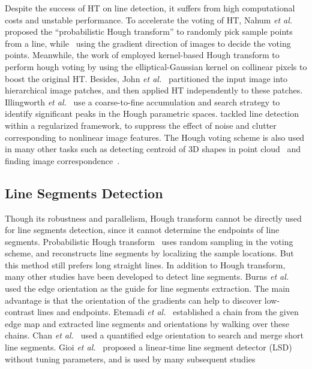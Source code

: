 \documentclass[10pt,journal,cspaper,compsoc]{IEEEtran}
\def\etal{\emph{et al.~}}
\begin{document}
Despite the success of HT on line detection, it suffers from high computational costs and unstable performance.
To accelerate the voting of HT, Nahum \etal \cite{kiryati1991probabilistic} 
proposed the ``probabilistic Hough transform'' to randomly pick 
sample points from a line, 
while~\cite{finding1976} using the gradient direction of images to decide 
the voting points.
Meanwhile, the work of \cite{fernandes2008real,limberger2015real} 
employed kernel-based Hough transform to perform hough voting by using 
the elliptical-Gaussian kernel on collinear pixels to boost the original HT.
Besides, John \etal \cite{princen1990hierarchical,yacoub1995hierarchical} partitioned the input image into
hierarchical image patches, and then applied HT independently to these patches.
Illingworth \etal \cite{illingworth1987adaptive} use a coarse-to-fine accumulation and search
strategy to identify significant peaks in the Hough parametric spaces.
\cite{aggarwal2006line} tackled line detection within a
regularized framework, to suppress the effect of noise and clutter corresponding to nonlinear image features.
The Hough voting scheme is also used in many other tasks such as
detecting centroid of 3D shapes in point cloud~\cite{qi2019deep} and finding image correspondence~\cite{min2019hyperpixel}.





\subsection{Line Segments Detection}
Though its robustness and parallelism, Hough transform cannot be directly used for line segments detection,
since it cannot determine the endpoints of line segments.
Probabilistic Hough transform~\cite{kiryati1991probabilistic} uses random sampling in the voting scheme,
and reconstructs line segments by localizing the sample locations.
But this method still prefers long straight lines.
In addition to Hough transform, many other studies have been developed to detect line segments.
Burns \etal \cite{burns1986extracting} used the edge orientation as the guide for line segments extraction.
The main advantage is that the orientation of the gradients can help to discover low-contrast lines
and endpoints.
Etemadi \etal \cite{etemadi1992robust} established a chain from the given edge map and
extracted line segments and orientations by walking over these chains.
Chan \etal \cite{chan1996line} used a quantified edge orientation to search and merge short line segments.
Gioi \etal \cite{von2008lsd} proposed a linear-time line segment detector (LSD) without tuning parameters,
and is used by many subsequent studies~\cite{akinlar2011edlines,akinlar2013edcircles,feng2013automatic}
\end{document}
